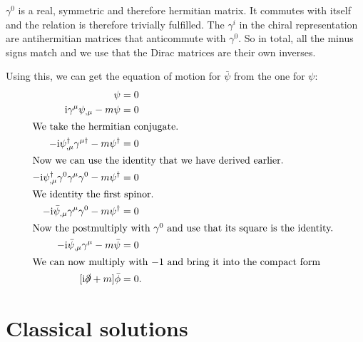\documentclass[11pt, english, fleqn, DIV=15, headinclude, BCOR=1cm]{scrartcl}
\begin{document}
$\gamma^0$ is a real, symmetric and therefore hermitian matrix. It commutes
with itself and the relation is therefore trivially fulfilled. The $\gamma^i$
in the chiral representation are antihermitian matrices that anticommute with
$\gamma^0$. So in total, all the minus signs match and we use that the Dirac
matrices are their own inverses.

Using this, we can get the equation of motion for $\bar\psi$ from the one for
$\psi$:
\begin{align*}
    [\iup \slashed\partial - m] \psi &= 0 \\
    \iup \gamma^\mu \psi_{,\mu} - m \psi &= 0 \\
    \intertext{%
        We take the hermitian conjugate.
    }
    - \iup \psi_{,\mu}^\dagger \gamma^{\mu\dagger} - m \psi^\dagger &= 0 \\
    \intertext{%
        Now we can use the identity that we have derived earlier.
    }
    - \iup \psi_{,\mu}^\dagger \gamma^0 \gamma^\mu \gamma^0 - m \psi^\dagger &= 0 \\
    \intertext{%
        We identity the first spinor.
    }
    - \iup \bar\psi_{,\mu} \gamma^\mu \gamma^0 - m \psi^\dagger &= 0 \\
    \intertext{%
        Now the postmultiply with $\gamma^0$ and use that its square is the
        identity.
    }
    - \iup \bar\psi_{,\mu} \gamma^\mu - m \bar\psi &= 0 \\
    \intertext{%
        We can now multiply with $-1$ and bring it into the compact form
    }
    [\iup \slashed\partial + m] \bar\phi &= 0.
\end{align*}

\section{Classical solutions}
\label{homework:2}
\end{document}
